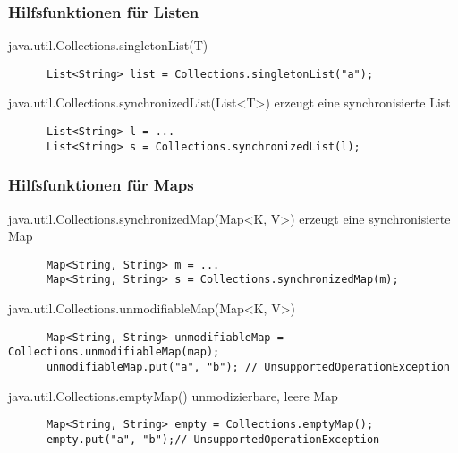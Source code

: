 \begin{frame}[fragile]
  \frametitle{Hilfsfunktionen für Listen}

  \begin{block}{java.util.Collections.singletonList(T)}
    \begin{lstlisting}
      List<String> list = Collections.singletonList("a");
    \end{lstlisting}
  \end{block}
  
  \pause
  
  \begin{block}{java.util.Collections.synchronizedList(List\textless T\textgreater)}
    erzeugt eine synchronisierte List
    \begin{lstlisting}
      List<String> l = ...
      List<String> s = Collections.synchronizedList(l);
    \end{lstlisting}
  \end{block}

\end{frame}




\begin{frame}[fragile]
  \frametitle{Hilfsfunktionen für Maps}

  \begin{block}{java.util.Collections.synchronizedMap(Map\textless K, V\textgreater)}
    erzeugt eine synchronisierte Map
    \begin{lstlisting}
      Map<String, String> m = ...
      Map<String, String> s = Collections.synchronizedMap(m);
    \end{lstlisting}
  \end{block}
  
  \pause

  \begin{block}{java.util.Collections.unmodifiableMap(Map\textless K, V\textgreater)}
    \begin{lstlisting}
      Map<String, String> unmodifiableMap = Collections.unmodifiableMap(map);
      unmodifiableMap.put("a", "b"); // UnsupportedOperationException
    \end{lstlisting}
  \end{block}

  \pause
  
  \begin{block}{java.util.Collections.emptyMap()}
    unmodizierbare, leere Map
    \begin{lstlisting}
      Map<String, String> empty = Collections.emptyMap();
      empty.put("a", "b");// UnsupportedOperationException
    \end{lstlisting}
  \end{block}

\end{frame}
  
